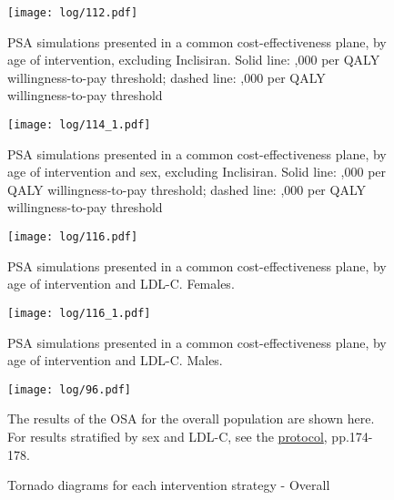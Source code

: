\documentclass[11pt]{article}
\begin{document}
\begin{figure}
    \centering
    \texttt{[image: log/112.pdf]}
    \caption{PSA simulations presented in a common cost-effectiveness plane, by age of intervention, excluding Inclisiran. Solid line: ,000 per QALY willingness-to-pay threshold; dashed line: ,000 per QALY willingness-to-pay threshold}
    \label{Scatter1}
\end{figure}

\begin{figure}
    \centering
    \texttt{[image: log/114\_1.pdf]}
    \caption{PSA simulations presented in a common cost-effectiveness plane, by age of intervention and sex, excluding Inclisiran. Solid line: ,000 per QALY willingness-to-pay threshold; dashed line: ,000 per QALY willingness-to-pay threshold}
    \label{Scatter1sex}
\end{figure}

\begin{figure}
    \centering
    \texttt{[image: log/116.pdf]}
    \caption{PSA simulations presented in a common cost-effectiveness plane, by age of intervention and LDL-C. Females.}
    \label{Scatter0sexldl0}
\end{figure}
\begin{figure}
    \centering
    \texttt{[image: log/116\_1.pdf]}
    \caption{PSA simulations presented in a common cost-effectiveness plane, by age of intervention and LDL-C. Males.}
    \label{Scatter0sexldl1}
\end{figure}


\clearpage


\begin{figure}
    \centering
    \texttt{[image: log/96.pdf]}
    \caption{Tornado diagrams for each intervention strategy - Overall}
    \label{Tornado0}
    The results of the OSA for the overall population are shown here. For results stratified by sex and LDL-C, see the \href{https://github.com/jimb0w/LDL}{protocol}, pp.174-178. 
\end{figure}


\clearpage

\clearpage

\end{document}
